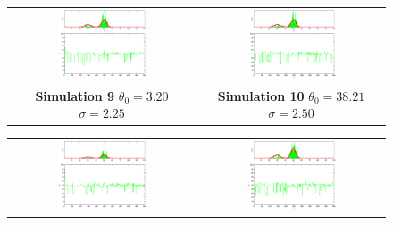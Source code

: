 \begin{figure}\label{fig: SimulationMetropolis1}
\begin{tabular}{cc} 
\includegraphics[width=0.5\textwidth]{ImaginiLatex/MetropolisExample9.eps} &
\includegraphics[width=0.5\textwidth]{ImaginiLatex/MetropolisExample10.eps} \\
\textbf{Simulation 9} $\theta_0=    3.20$  $\sigma=    2.25$  & \textbf{Simulation 10} $\theta_0=   38.21$  $\sigma=    2.50$
\end{tabular}
\begin{tabular}{cc} 
\includegraphics[width=0.5\textwidth]{ImaginiLatex/MetropolisExample11.eps} &
\includegraphics[width=0.5\textwidth]{ImaginiLatex/MetropolisExample12.eps} \\

\end{tabular}
\end{figure}
